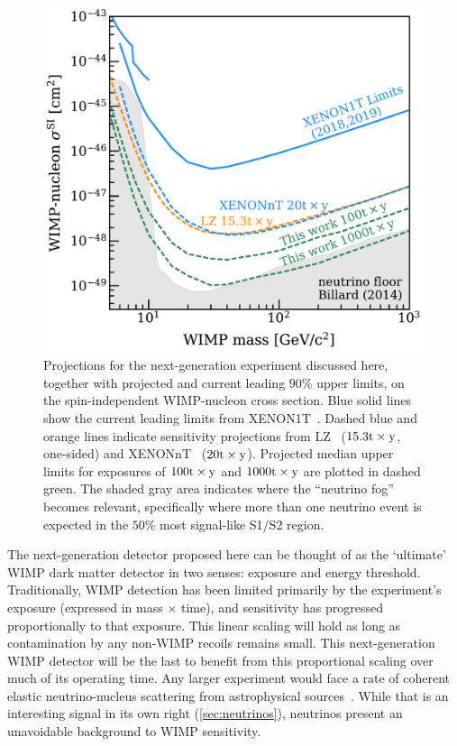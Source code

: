 \begin{figure}[!htbp] 
	\centering
    \includegraphics[width=\columnwidth,clip]{fig_simplified_projection_si.pdf}
    \caption{Projections for the next-generation experiment discussed here, together with projected and current leading $90\%$ upper limits, on the spin-independent WIMP-nucleon cross section. Blue solid lines show the current leading limits from XENON1T~\cite{Aprile:2018dbl,Aprile:2019xxb}. Dashed blue and orange lines indicate sensitivity projections from LZ~\cite{Akerib:2018lyp} ($15.3\mathrm{t}\times\mathrm{y}$, one-sided) and XENONnT~\cite{Aprile:2020vtw} ($20\mathrm{t}\times\mathrm{y}$). Projected median upper limits for exposures of $100\mathrm{t}\times\mathrm{y}$ and $1000\mathrm{t}\times\mathrm{y}$ are plotted in dashed green. The shaded gray area indicates where the ``neutrino fog''~\cite{Billard:2014yka} becomes relevant, specifically where more than one neutrino event is expected in the $50\%$ most signal-like S1/S2 region.}
\label{fig:si_sensitivity}
\end{figure}

The next-generation detector proposed here can be thought of as the `ultimate' WIMP dark matter detector in two senses: exposure and energy threshold. Traditionally, WIMP detection has been limited primarily by the experiment's exposure (expressed in mass $\times$ time), and sensitivity has progressed proportionally to that exposure. This linear scaling will hold as long as contamination by any non-WIMP recoils remains small. This next-generation WIMP detector will be the last to benefit from this proportional scaling over much of its operating time. Any larger experiment would face a rate of coherent elastic neutrino-nucleus scattering from astrophysical sources~\cite{Monroe:2007xp,Billard:2013qya}. While that is an interesting signal in its own right (\autoref{sec:neutrinos}), neutrinos present an unavoidable background to WIMP sensitivity. 


